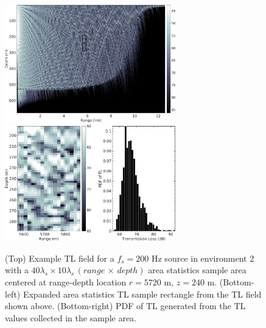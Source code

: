 \begin{figure}[htb]
  \centering
  \includegraphics[width=0.66\textwidth]{./figs/asuq_figs/3a}
  \includegraphics[width=0.66\textwidth]{./figs/asuq_figs/3bc}
  \caption[An example \ac{TL} field with area statistics applied and
  the resulting \ac{PDF} of \ac{TL}]{(Top) Example \ac{TL} field for a $f_s=200$ Hz source in environment 2
    with a $40\lambda_s \times 10\lambda_s\, (range\, \times\, depth)$ area statistics sample area
    centered at range-depth location $r = 5720$ m, $z = 240$ m. (Bottom-left)
    Expanded area statistics \ac{TL} sample rectangle from the \ac{TL} field
    shown above.  (Bottom-right) \ac{PDF} of \ac{TL} generated from the \ac{TL} values
    collected in the sample area.}
  \label{fig:asuq_astats_example}
\end{figure}

